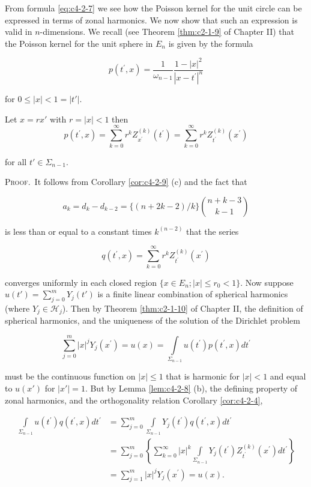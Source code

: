 From formula \eqref{eq:c4-2-7} we see how the Poisson kernel for the unit circle can be expressed in terms of zonal harmonics. We now show that such an expression is valid in $n$-dimensions. We recall (see Theorem \ref{thm:c2-1-9} of Chapter II) that the Poisson kernel for the unit sphere in $E_n$ is given by the formula

\[
p(t^{\prime},x)=\frac{1}{\omega_{n-1}}\frac{1-|x|^{2}}{|x-t^{\prime}|^{n}}
\]

for $0 \leq |x| < 1 = |t'|$.

\begin{theorem}
\label{thm:c4-2-10}
Let $x = rx'$ with $r = |x| < 1$ then
\[
p(t^{\prime},x)=\sum_{k=0}^{\infty}r^{k}Z_{x^{\prime}}^{(k)}(t^{\prime})=\sum_{k=0}^{\infty}r^{k}Z_{t^{\prime}}^{(k)}(x^{\prime})
\]

for all $t' \in \Sigma_{n-1}$.
\end{theorem}

\textsc{Proof.}\ It follows from Corollary \ref{cor:c4-2-9} (c) and the fact that

\[
a_{k}=d_{k}-d_{k-2}=\{(n+2k-2)/k\}\binom{n+k-3}{k-1}
\]

is less than or equal to a constant times $k^{(n-2)}$ that the series

\[
q(t^{\prime},x)=\sum_{k=0}^{\infty}r^{k}Z_{t^{\prime}}^{(k)}(x^{\prime})
\]

converges uniformly in each closed region $\{x \in E_n; |x| \leq r_0 < 1\}$. Now suppose $u(t') = \sum_{j=0}^m Y_j(t')$ is a finite linear combination of spherical harmonics (where $Y_j \in \mathcal{H}_j$). Then by Theorem \ref{thm:c2-1-10} of Chapter II, the definition of spherical harmonics, and the uniqueness of the solution of the Dirichlet problem

\[
\sum_{j=0}^{m}|x|^{j}Y_{j}(x^{\prime})=u(x)=\int\limits_{\Sigma_{n-1}}u(t^{\prime})p(t^{\prime},x)dt^{\prime}
\]

must be the continuous function on $|x| \leq 1$ that is harmonic for $|x| < 1$ and equal to $u(x')$ for $|x'| = 1$. But by Lemma \ref{lem:c4-2-8} (b), the defining property of zonal harmonics, and the orthogonality relation Corollary \ref{cor:c4-2-4},

\[
\begin{aligned}\int\limits_{\Sigma_{n-1}}u(t^{\prime})q(t^{\prime},x)dt^{\prime}&=\sum_{j=0}^{m}\int\limits_{\Sigma_{n-1}}Y_{j}(t^{\prime})q(t^{\prime},x)dt^{\prime}\\&=\sum_{j=0}^{m}\left\{\sum_{k=0}^{\infty}|x|^{k}\int\limits_{\Sigma_{n-1}}Y_{j}(t^{\prime})Z_{t^{\prime}}^{(k)}(x^{\prime})dt^{\prime}\right\}\\&=\sum_{j=1}^{m}|x|^{j}Y_{j}(x^{\prime})=u(x).\end{aligned}
\]

